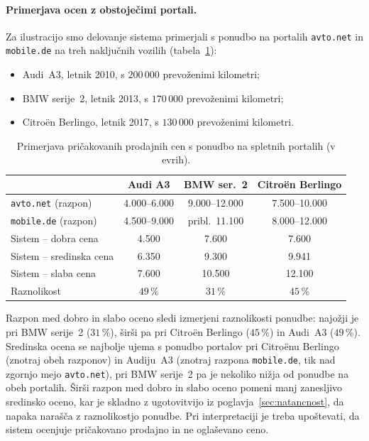 \paragraph{Primerjava ocen z obstoječimi portali.}
Za ilustracijo smo delovanje sistema primerjali s ponudbo na portalih
\texttt{avto.net} in \texttt{mobile.de} na treh naključnih vozilih
(tabela~\ref{tab:vrednotenje}):
\begin{itemize}
  \item Audi~A3, letnik 2010, s $200\,000$ prevoženimi kilometri;
  \item BMW serije~2, letnik 2013, s $170\,000$ prevoženimi kilometri;
  \item Citroën Berlingo, letnik 2017, s $130\,000$ prevoženimi kilometri.
\end{itemize}

\begin{table}[htbp]
  \centering
  \caption{Primerjava pričakovanih prodajnih cen s ponudbo na spletnih portalih (v evrih).}
  \label{tab:vrednotenje}
  \setlength{\tabcolsep}{5pt}
  \begin{tabular}{lccc}
    \toprule
    & \textbf{Audi A3} & \textbf{BMW ser.\ 2} & \textbf{Citroën Berlingo} \\
    \midrule
    \texttt{avto.net} (razpon)   & 4.000--6.000  & 9.000--12.000  & 7.500--10.000 \\
    \texttt{mobile.de} (razpon)  & 4.500--9.000  & pribl.\ 11.100 & 8.000--12.000 \\
    \midrule
    Sistem -- dobra cena      & 4.500  & 7.600   & 7.600  \\
    Sistem -- sredinska cena  & 6.350  & 9.300   & 9.941  \\
    Sistem -- slaba cena      & 7.600  & 10.500  & 12.100 \\
    Raznolikost                & $49\,\%$ & $31\,\%$ & $45\,\%$ \\
    \bottomrule
  \end{tabular}
\end{table}

Razpon med dobro in slabo oceno sledi izmerjeni raznolikosti ponudbe: najožji je
pri BMW serije~2 ($31\,\%$), širši pa pri Citroën Berlingo ($45\,\%$) in
Audi~A3 ($49\,\%$). Sredinska ocena se najbolje ujema s ponudbo portalov pri
Citroënu Berlingo (znotraj obeh razponov) in Audiju~A3 (znotraj razpona
\texttt{mobile.de}, tik nad zgornjo mejo \texttt{avto.net}), pri BMW serije~2 pa
je nekoliko nižja od ponudbe na obeh portalih. Širši razpon med dobro in slabo
oceno pomeni manj zanesljivo sredinsko oceno, kar je skladno z ugotovitvijo iz
poglavja~\ref{sec:natancnost}, da napaka narašča z raznolikostjo ponudbe.
Pri interpretaciji je treba upoštevati, da sistem ocenjuje pričakovano prodajno
in ne oglaševano ceno.
